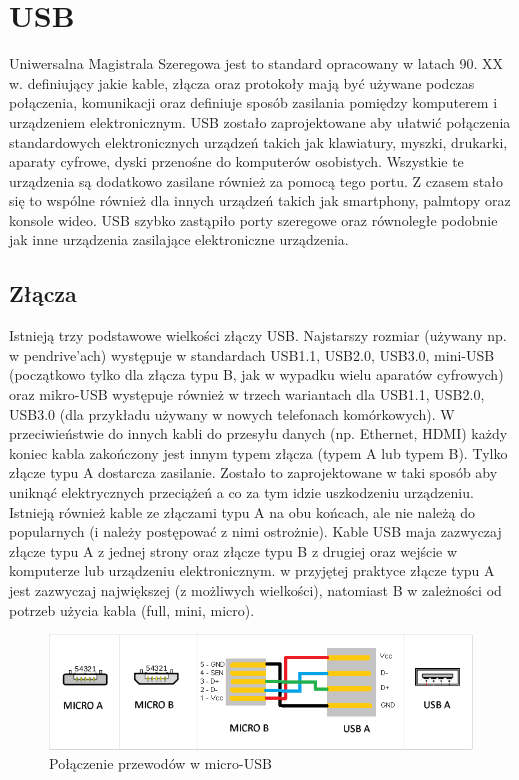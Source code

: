 \documentclass{BscUS}
\begin{document}
\chapter{USB}
\label{USBStandardChapter}
Uniwersalna Magistrala Szeregowa jest to standard opracowany w latach 90. XX w. definiujący jakie kable, złącza oraz protokoły mają być używane podczas połączenia, komunikacji oraz definiuje sposób zasilania pomiędzy komputerem i urządzeniem elektronicznym.
\newline
USB zostało zaprojektowane aby ułatwić połączenia standardowych elektronicznych urządzeń takich jak klawiatury, myszki, drukarki, aparaty cyfrowe, dyski przenośne do komputerów osobistych. Wszystkie te urządzenia są dodatkowo zasilane również za pomocą tego portu. Z czasem stało się to wspólne również dla innych urządzeń takich jak smartphony, palmtopy oraz konsole wideo.
\newline
USB szybko zastąpiło porty szeregowe oraz równoległe podobnie jak inne urządzenia zasilające elektroniczne urządzenia.
\section{Złącza}
Istnieją trzy podstawowe wielkości złączy USB. Najstarszy rozmiar (używany np. w pendrive'ach) występuje w standardach USB1.1, USB2.0, USB3.0, mini-USB (początkowo tylko dla złącza typu B, jak w wypadku wielu aparatów cyfrowych) oraz mikro-USB występuje również w trzech wariantach dla USB1.1, USB2.0, USB3.0 (dla przykładu używany w nowych telefonach komórkowych).
\newline
W przeciwieństwie do innych kabli do przesyłu danych (np. Ethernet, HDMI) każdy koniec kabla zakończony jest innym typem złącza (typem A lub typem B). Tylko złącze typu A dostarcza zasilanie. Zostało to zaprojektowane w taki sposób aby uniknąć elektrycznych przeciążeń a co za tym idzie uszkodzeniu urządzeniu. Istnieją również kable ze złączami typu A na obu końcach, ale nie należą do popularnych (i należy postępować z nimi ostrożnie). Kable USB maja zazwyczaj złącze typu A z jednej strony oraz złącze typu B z drugiej oraz wejście w komputerze lub urządzeniu elektronicznym. w przyjętej praktyce złącze typu A jest zazwyczaj największej (z możliwych wielkości), natomiast B w zależności od potrzeb użycia kabla (full, mini, micro). 

\begin{figure}[h]
\centering
\includegraphics[width=15cm]{./img/micro-usb-type}
\caption{Połączenie przewodów w micro-USB}
\end{figure}
\end{document}
